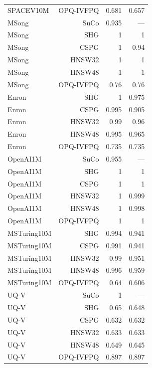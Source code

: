 \begin{table}[t]
\begin{tabular}{lrrr}
SPACEV10M & OPQ-IVFPQ & 0.681 & 0.657 \\
MSong & SuCo & 0.935 & — \\
MSong & SHG & 1 & 1 \\
MSong & CSPG & 1 & 0.94 \\
MSong & HNSW32 & 1 & 1 \\
MSong & HNSW48 & 1 & 1 \\
MSong & OPQ-IVFPQ & 0.76 & 0.76 \\
Enron & SHG & 1 & 0.975 \\
Enron & CSPG & 0.995 & 0.905 \\
Enron & HNSW32 & 0.99 & 0.96 \\
Enron & HNSW48 & 0.995 & 0.965 \\
Enron & OPQ-IVFPQ & 0.735 & 0.735 \\
OpenAI1M & SuCo & 0.955 & — \\
OpenAI1M & SHG & 1 & 1 \\
OpenAI1M & CSPG & 1 & 1 \\
OpenAI1M & HNSW32 & 1 & 0.999 \\
OpenAI1M & HNSW48 & 1 & 0.998 \\
OpenAI1M & OPQ-IVFPQ & 1 & 1 \\
MSTuring10M & SHG & 0.994 & 0.941 \\
MSTuring10M & CSPG & 0.991 & 0.941 \\
MSTuring10M & HNSW32 & 0.99 & 0.951 \\
MSTuring10M & HNSW48 & 0.996 & 0.959 \\
MSTuring10M & OPQ-IVFPQ & 0.64 & 0.606 \\
UQ-V & SuCo & 1 & — \\
UQ-V & SHG & 0.65 & 0.648 \\
UQ-V & CSPG & 0.632 & 0.632 \\
UQ-V & HNSW32 & 0.633 & 0.633 \\
UQ-V & HNSW48 & 0.649 & 0.645 \\
UQ-V & OPQ-IVFPQ & 0.897 & 0.897 \\
\bottomrule
\end{tabular}
\end{table}
